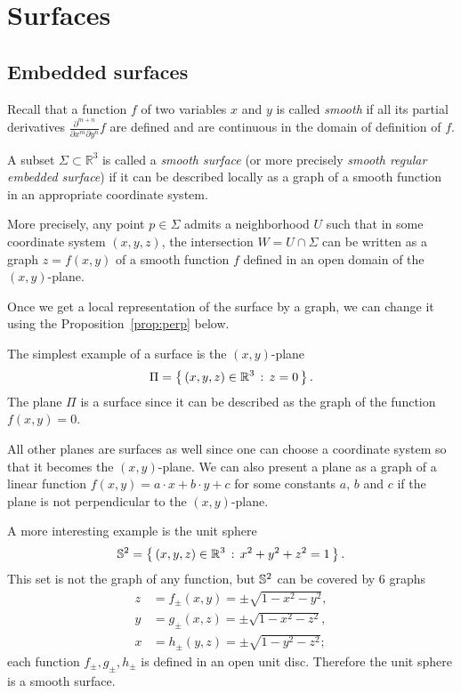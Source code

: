 \chapter{Surfaces}
\section{Embedded surfaces}

Recall that a function $f$ of two variables $x$ and $y$ is called \emph{smooth} if all its partial derivatives $\frac{\partial^{m+n}}{\partial x^m\partial y^n}f$ are defined and are continuous in the domain of definition of $f$. 

A subset $\Sigma \subset \mathbb{R}^3$ is called a \emph{smooth surface} (or more precisely \emph{smooth regular embedded surface}) if it can be described locally as a graph of a smooth function in an appropriate coordinate system.

More precisely, any point $p\in \Sigma$ admits a neighborhood $U$ such that
in some coordinate system $(x,y,z)$, 
the intersection $W=U\cap \Sigma$ can be written as a graph $z=f(x,y)$ of a smooth function $f$ defined in an open domain of the $(x,y)$-plane.

Once we get a local representation of the surface by a graph, we can change it using the Proposition~\ref{prop:perp} below.

The simplest example of a surface is the $(x,y)$-plane 
\[\Pi=\left\{\,{(x,y,z)\in\mathbb{R}^3}\,:\,{z=0}\,\right\}.\]
The plane $\Pi$ is a surface since
it can be described as the graph of the function $f(x,y)=0$.

All other planes are surfaces as well since one can choose a coordinate system so that it becomes the $(x,y)$-plane.
We can also present a plane as a graph of a linear function 
$f(x,y)=a\cdot x+b\cdot y+c$ for some constants $a$, $b$ and $c$
if the plane is not perpendicular to the $(x,y)$-plane.

A more interesting example is the unit sphere 
\[\mathbb{S}^2=\left\{\,{(x,y,z)\in\mathbb{R}^3}\,:\,{x^2+y^2+z^2=1}\,\right\}.\]
This set is not the graph of any function,
but $\mathbb{S}^2$
can be covered by 6 graphs 
\begin{align*}
z&=f_\pm(x,y)=\pm \sqrt{1-x^2-y^2},
\\
y&=g_\pm(x,z)=\pm \sqrt{1-x^2-z^2},
\\
x&=h_\pm(y,z)=\pm \sqrt{1-y^2-z^2};
\end{align*}
each function $f_\pm,g_\pm,h_\pm$ is defined in an open unit disc.
Therefore the unit sphere is a smooth surface.


